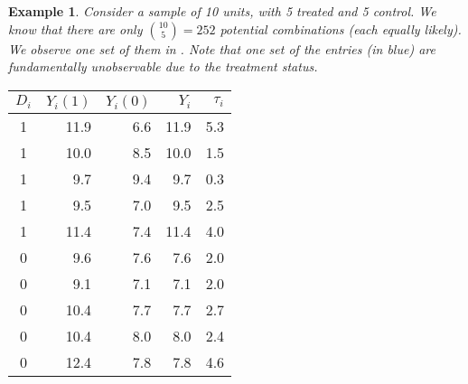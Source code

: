 \documentclass{tufte-handout}
\theoremstyle{break}
\newtheorem{exmp}{Example}
\begin{document}
\begin{boxD}
  \begin{exmp}
    \label{example1_randomization}
    Consider a sample of 10 units, with 5 treated and 5 control. We know that there are only ${10 \choose 5}= 252$ potential combinations (each equally likely).  We observe one set of them in  . Note that one set of the entries (in blue) are fundamentally unobservable due to the treatment status.
  \end{exmp}
\end{boxD}
\begin{margintable}
  \begin{tabular}{crrrr}
    \toprule
    $D_{i}$ & $Y_{i}(1)$              & $Y_{i}(0)$              & $Y_{i}$ & $\tau_{i}$               \\
    \midrule
    1       & 11.9                    & \cellcolor{main!25} 6.6 & 11.9    & \cellcolor{main!25}5.3  \\
    1       & 10.0                    & \cellcolor{main!25} 8.5 & 10.0    & \cellcolor{main!25}1.5  \\
    1       & 9.7                     & \cellcolor{main!25} 9.4 & 9.7     & \cellcolor{main!25}0.3  \\
    1       & 9.5                     & \cellcolor{main!25} 7.0 & 9.5     & \cellcolor{main!25}2.5  \\
    1       & 11.4                    & \cellcolor{main!25} 7.4 & 11.4    & \cellcolor{main!25}4.0  \\
    0       & \cellcolor{main!25} 9.6 & 7.6                     & 7.6     & \cellcolor{main!25}2.0  \\
    0       & \cellcolor{main!25}9.1  & 7.1                     & 7.1     & \cellcolor{main!25}2.0  \\
    0       & \cellcolor{main!25}10.4 & 7.7                     & 7.7     & \cellcolor{main!25}2.7  \\
    0       & \cellcolor{main!25}10.4 & 8.0                     & 8.0     & \cellcolor{main!25} 2.4 \\
    0       & \cellcolor{main!25}12.4 & 7.8                     & 7.8     & \cellcolor{main!25}4.6  \\
    \bottomrule
  \end{tabular}
  \caption{Example of a randomization over $n = 10$ units. The highlighted entries are unobservable due to the fundamental problem of causal inference.}
  \label{tab:ex_randomized1}
\end{margintable}
\end{document}
